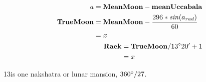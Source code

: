 \documentclass[11pt,oneside]{memoir-article}
\begin{document}
\begin{align}
\begin{split}
                 a &= \mathbf{MeanMoon} - \mathbf{meanUccabala}\\
 \mathbf{TrueMoon} &= \mathbf{MeanMoon} - \frac{296 * \mathit{sin}(a_{rad})}{60}\\
                   &= x
\end{split}\\
\begin{split}
     \mathbf{Raek} &= \mathbf{TrueMoon} / 13^\circ 20^\prime + 1\\
                   &= x
\end{split}
\end{align}

13\minute is one nakshatra or lunar mansion, $360^\circ / 27$.
\end{document}
